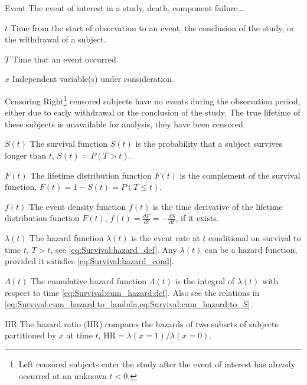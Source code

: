 \begin{symbollist}
	\item[Event] The event of interest in a study, \eg death, component failure\ldots
	\item[$t$] Time from the start of observation to an event, the conclusion of the study, or the withdrawal of a subject.
	\item[$T$] Time that an event occurred.
	\item[$x$] Independent variable(s) under consideration.
	\item[Censoring] Right\footnote{Left censored subjects enter the study after the event of interest has already occurred at an unknown $t < 0$.} censored subjects have no events during the observation period, either due to early withdrawal or the conclusion of the study. The true lifetime of these subjects is unavailable for analysis, \ie they have been censored.
	\item[$S\left(t\right)$] The survival function $S\left(t\right)$ is the probability that a subject survives longer than $t$, \ie $S\left(t\right) = P\left(T > t\right)$.
	\item[$F\left(t\right)$] The lifetime distribution function $F\left(t\right)$ is the complement of the survival function, \ie $F\left(t\right) = 1 - S\left(t\right) = P\left(T \leq t\right)$.
	\item[$f\left(t\right)$] The event density function $f\left(t\right)$ is the time derivative of the lifetime distribution function $F\left(t\right)$, $f\left(t\right) = \frac{dF}{dt} = -\frac{dS}{dt}$, if it exists.
	\item[$\lambda\left(t\right)$] The hazard function $\lambda\left(t\right)$ is the event rate at $t$ conditional on survival to time $t$, \ie $T > t$, see \cref{eq:Survival:hazard_def}. Any $\lambda\left(t\right)$ can be a hazard function, provided it satisfies \cref{eq:Survival:hazard_cond}.
	\item[$\Lambda\left(t\right)$] The cumulative hazard function $\Lambda\left(t\right)$ is the integral of $\lambda\left(t\right)$ with respect to time \cref{eq:Survival:cum_hazard:def}. Also see the relations in \cref{eq:Survival:cum_hazard:to_lambda,eq:Survival:cum_hazard:to_S}.
	\item[HR] The hazard ratio (HR) compares the hazards of two subsets of subjects partitioned by $x$ at time $t$, $\text{HR} = \lambda\left(x = 1\right) / \lambda\left(x=0\right)$. %
\end{symbollist}

